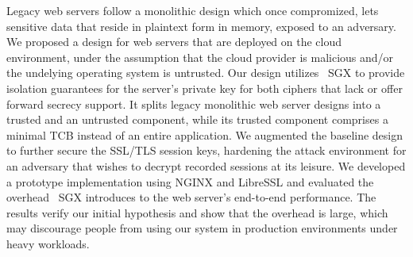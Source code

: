 \documentclass[../main.tex]{subfiles}
\begin{document}
Legacy web servers follow a monolithic design which once compromized, lets
sensitive data that reside in plaintext form in memory, exposed to an
adversary.  We proposed a design for web servers that are deployed on the cloud
environment, under the assumption that the cloud provider is malicious and/or
the undelying operating system is untrusted. Our design utilizes \Intel~SGX to
provide isolation guarantees for the server's private key for both ciphers that
lack or offer forward secrecy support. It splits legacy monolithic web server
designs into a trusted and an untrusted component, while its trusted component
comprises a minimal TCB instead of an entire application. We augmented the
baseline design to further secure the SSL/TLS session keys, hardening the
attack environment for an adversary that wishes to decrypt recorded sessions at
its leisure. We developed a prototype implementation using NGINX and LibreSSL
and evaluated the overhead \Intel~SGX introduces to the web server's end-to-end
performance. The results verify our initial hypothesis and show that the
overhead is large, which may discourage people from using our system in
production environments under heavy workloads.
\end{document}
